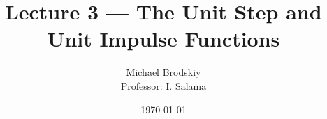 


\title{Lecture 3 — The Unit Step and Unit Impulse Functions}
\date{\today}
\author{Michael Brodskiy\\ \small Professor: I. Salama}



\maketitle

